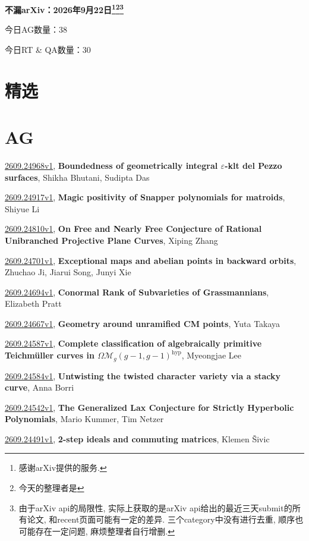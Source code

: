 \documentclass[9pt, a4paper]{article}
\theoremstyle{plain}
\theoremstyle{definition}
\theoremstyle{remark}
\newcommand{\arxiv}[3]{\href{https://arxiv.org/abs/#1}{#1}, \textbf{\textcolor{arxivblue}{#2}}, #3}
\newcommand{\AGnumber}{38}
\newcommand{\RTQAnumber}{30}
\newcommand{\NewestDate}{2026年9月22日}
\newcommand{\todayarXiver}{} %
\begin{document}
\begin{center}
    \Huge\textbf{不漏arXiv：\NewestDate\footnote{感谢arXiv提供的服务.}\footnote{今天的整理者是\todayarXiver}\footnote{由于arXiv api的局限性, 实际上获取的是arXiv api给出的最近三天submit的所有论文, 和recent页面可能有一定的差异. 三个category中没有进行去重, 顺序也可能存在一定问题, 麻烦整理者自行增删.}} \\
\end{center}

\setcounter{section}{-1}

\begin{center}
    今日AG数量：\AGnumber
    
    今日RT \& QA数量：\RTQAnumber
    
\end{center}


\section{精选}


\section{AG}
\arxiv{2609.24968v1}{Boundedness of geometrically integral $ε$-klt del Pezzo surfaces}{Shikha Bhutani, Sudipta Das}

\arxiv{2609.24917v1}{Magic positivity of Snapper polynomials for matroids}{Shiyue Li}

\arxiv{2609.24810v1}{On Free and Nearly Free Conjecture of Rational Unibranched Projective Plane Curves}{Xiping Zhang}

\arxiv{2609.24701v1}{Exceptional maps and abelian points in backward orbits}{Zhuchao Ji, Jiarui Song, Junyi Xie}

\arxiv{2609.24694v1}{Conormal Rank of Subvarieties of Grassmannians}{Elizabeth Pratt}

\arxiv{2609.24667v1}{Geometry around unramified CM points}{Yuta Takaya}

\arxiv{2609.24587v1}{Complete classification of algebraically primitive Teichmüller curves in $Ω\mathcal{M}_g(g-1,g-1)^{\mathrm{hyp}}$}{Myeongjae Lee}

\arxiv{2609.24584v1}{Untwisting the twisted character variety via a stacky curve}{Anna Borri}

\arxiv{2609.24542v1}{The Generalized Lax Conjecture for Strictly Hyperbolic Polynomials}{Mario Kummer, Tim Netzer}

\arxiv{2609.24491v1}{2-step ideals and commuting matrices}{Klemen Šivic}
\end{document}
